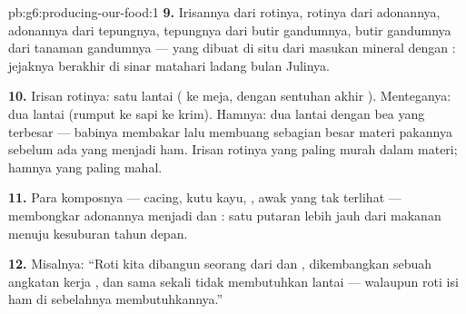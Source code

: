 \begin{solution}{pb:g6:producing-our-food:1}
\textbf{9.} Irisannya dari rotinya, rotinya dari adonannya, adonannya
dari tepungnya, tepungnya dari butir gandumnya, butir gandumnya dari
 tanaman gandumnya --- yang dibuat di situ dari masukan mineral
dengan : jejaknya berakhir di sinar matahari ladang bulan
Julinya.

\textbf{10.} Irisan rotinya: satu lantai ( ke meja, dengan
sentuhan akhir ). Menteganya: dua lantai (rumput ke sapi ke
krim). Hamnya: dua lantai dengan bea yang terbesar --- babinya
membakar lalu membuang sebagian besar materi pakannya sebelum ada yang
menjadi ham. Irisan rotinya yang paling murah dalam materi; hamnya
yang paling mahal.

\textbf{11.} Para  komposnya --- cacing, kutu kayu, ,
awak yang tak terlihat --- membongkar  adonannya menjadi
 dan : satu putaran lebih jauh dari makanan menuju
kesuburan  tahun depan.

\textbf{12.} Misalnya: ``Roti kita dibangun seorang  dari
 dan , dikembangkan sebuah angkatan kerja ,
dan sama sekali tidak membutuhkan lantai  --- walaupun roti isi
ham di sebelahnya membutuhkannya.''
\end{solution}
